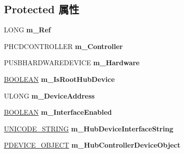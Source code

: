 \subsection*{Protected 属性}
\begin{DoxyCompactItemize}
\item 
\mbox{\label{class_c_hub_controller_a35c82752f4e535febb5dbab965f26d2e}} 
L\+O\+NG {\bfseries m\+\_\+\+Ref}
\item 
\mbox{\label{class_c_hub_controller_afccc4f51ff8eaec9bfabfc6160c14906}} 
P\+H\+C\+D\+C\+O\+N\+T\+R\+O\+L\+L\+ER {\bfseries m\+\_\+\+Controller}
\item 
\mbox{\label{class_c_hub_controller_aff0b037fc8975f0dd7e333aa76e14428}} 
P\+U\+S\+B\+H\+A\+R\+D\+W\+A\+R\+E\+D\+E\+V\+I\+CE {\bfseries m\+\_\+\+Hardware}
\item 
\mbox{\label{class_c_hub_controller_a10d8fcc3bd3af5d31c6f2c2b0b0e2402}} 
\hyperlink{_processor_bind_8h_a112e3146cb38b6ee95e64d85842e380a}{B\+O\+O\+L\+E\+AN} {\bfseries m\+\_\+\+Is\+Root\+Hub\+Device}
\item 
\mbox{\label{class_c_hub_controller_af304733b0f2d82dd516f26502f6a8c3e}} 
U\+L\+O\+NG {\bfseries m\+\_\+\+Device\+Address}
\item 
\mbox{\label{class_c_hub_controller_a16a0e0ceb0b973228981f52d46db39d3}} 
\hyperlink{_processor_bind_8h_a112e3146cb38b6ee95e64d85842e380a}{B\+O\+O\+L\+E\+AN} {\bfseries m\+\_\+\+Interface\+Enabled}
\item 
\mbox{\label{class_c_hub_controller_afa26af8409e6d4d51352a9cd9cbb37bb}} 
\hyperlink{struct___u_n_i_c_o_d_e___s_t_r_i_n_g}{U\+N\+I\+C\+O\+D\+E\+\_\+\+S\+T\+R\+I\+NG} {\bfseries m\+\_\+\+Hub\+Device\+Interface\+String}
\item 
\mbox{\label{class_c_hub_controller_a3370125b6ec22733b32082fd11e2589d}} 
\hyperlink{struct___d_e_v_i_c_e___o_b_j_e_c_t}{P\+D\+E\+V\+I\+C\+E\+\_\+\+O\+B\+J\+E\+CT} {\bfseries m\+\_\+\+Hub\+Controller\+Device\+Object}
\item 
\mbox{\label{class_c_hub_controller_aa5908e502cb36dd45fce7f30cb69fd44}} 

\end{DoxyCompactItemize}
